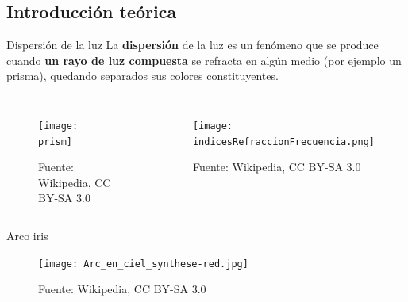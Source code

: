 \documentclass[]{presentation}
\begin{document}
\subsection{Introducción teórica}
\begin{frame}{Dispersión de la luz}
La \textbf{dispersión} de la luz es un fenómeno que se produce cuando \textbf{un rayo de luz compuesta} se refracta en algún medio (por ejemplo un prisma), quedando separados sus colores constituyentes.
\begin{columns}
	\begin{figure}
		\texttt{[image: prism]}
		\caption{\tiny Fuente: Wikipedia, CC BY-SA 3.0}
	\end{figure}
	\begin{figure}
		\texttt{[image: indicesRefraccionFrecuencia.png]}
		\caption{\tiny Fuente: Wikipedia, CC BY-SA 3.0}
	\end{figure}
\end{columns}
\end{frame}

\begin{frame}{Arco iris}
\begin{figure}
	\centering
	\texttt{[image: Arc\_en\_ciel\_synthese-red.jpg]}
	\caption{\tiny Fuente: Wikipedia, CC BY-SA 3.0}
\end{figure}
\end{frame}
\end{document}
